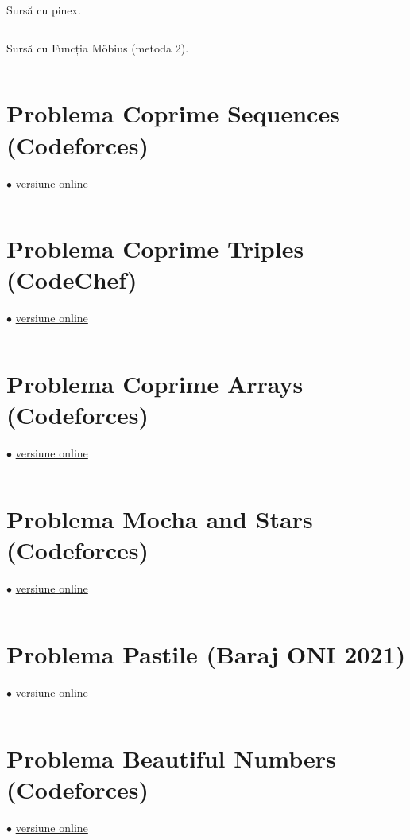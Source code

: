 \documentclass[../main.tex]{subfiles}
\begin{document}
Sursă cu pinex.

\inputminted{cpp}{../src/math/counting-coprime-pairs-pie.cpp}

Sursă cu Funcția Möbius (metoda 2).

\inputminted{cpp}{../src/math/counting-coprime-pairs-mobius.cpp}

\section{Problema Coprime Sequences (Codeforces)}
\label{code:coprime-sequences}
$\bullet$
\href{https://codeforces.com/contest/803/submission/235854084}{versiune online}

\inputminted{cpp}{../src/math/coprime-sequences.cpp}

\section{Problema Coprime Triples (CodeChef)}
\label{code:coprime-triples}
$\bullet$
\href{https://www.codechef.com/viewsolution/1033863400}{versiune online}

\inputminted{cpp}{../src/math/coprime-triples.cpp}

\section{Problema Coprime Arrays (Codeforces)}
\label{code:coprime-arrays}
$\bullet$
\href{https://codeforces.com/contest/915/submission/286542161}{versiune online}

\inputminted{cpp}{../src/math/coprime-arrays.cpp}

\section{Problema Mocha and Stars (Codeforces)}
\label{code:mocha-and-stars}
$\bullet$
\href{https://codeforces.com/contest/1559/submission/356926127}{versiune online}

\inputminted{cpp}{../src/math/mocha-and-stars.cpp}

\section{Problema Pastile (Baraj ONI 2021)}
\label{code:pastile}
$\bullet$
\href{https://kilonova.ro/submissions/144107}{versiune online}

\inputminted{cpp}{../src/math/pastile.cpp}

\section{Problema Beautiful Numbers (Codeforces)}
\label{code:beautiful-numbers}
$\bullet$
\href{https://codeforces.com/contest/300/submission/235722097}{versiune online}

\inputminted{cpp}{../src/math/beautiful-numbers.cpp}
\end{document}
